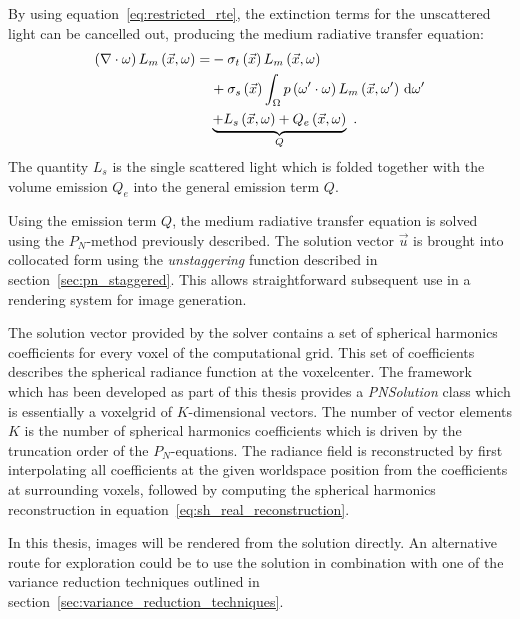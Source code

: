 By using equation~\ref{eq:restricted_rte}, the extinction terms for the unscattered light can be cancelled out, producing the medium radiative transfer equation:
\begin{align}
\left(\nabla\cdot\omega\right)L_m\left(\vec{x}, \omega \right)
=&
-\sigma_t\left(\vec{x}\right) L_m\left(\vec{x}, \omega \right)\nonumber\\
&
+\sigma_s\left(\vec{x}\right) \int_{\Omega}
{
p\left(\omega'\cdot\omega\right)L_m\left(\vec{x}, \omega' \right)\,\mathrm{d}\omega'
}
\nonumber
\\
&
\underbrace
{
+L_s\left(\vec{x}, \omega\right)
+Q_e\left(\vec{x}, \omega\right)
}_{Q}
\nonumber
\  .
\end{align}
The quantity $L_s$ is the single scattered light which is folded together with the volume emission $Q_e$ into the general emission term $Q$.

Using the emission term $Q$, the medium radiative transfer equation is solved using the $P_N$-method previously described. The solution vector $\vec{u}$ is brought into collocated form using the \emph{unstaggering} function described in section~\ref{sec:pn_staggered}. This allows straightforward subsequent use in a rendering system for image generation. 

The solution vector provided by the solver contains a set of spherical harmonics coefficients for every voxel of the computational grid. This set of coefficients describes the spherical radiance function at the voxelcenter. The framework which has been developed as part of this thesis provides a \emph{PNSolution} class which is essentially a voxelgrid of $K$-dimensional vectors. The number of vector elements $K$ is the number of spherical harmonics coefficients which is driven by the truncation order of the $P_N$-equations. The radiance field is reconstructed by first interpolating all coefficients at the given worldspace position from the coefficients at surrounding voxels, followed by computing the spherical harmonics reconstruction in equation~\ref{eq:sh_real_reconstruction}.

In this thesis, images will be rendered from the solution directly. An alternative route for exploration could be to use the solution in combination with one of the variance reduction techniques outlined in section~\ref{sec:variance_reduction_techniques}.

